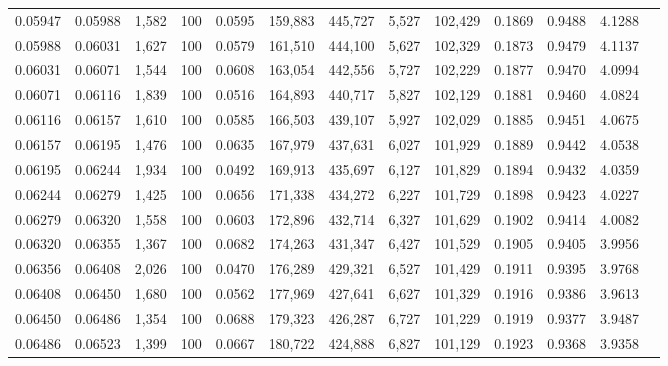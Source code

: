 \begin{tabular}{rrrrrrrrrrrrr}
0.05947 & 0.05988 & 1,582 & 100 &                                     0.0595 & 159,883 & 445,727 &   5,527 & 102,429 & 0.1869 & 0.9488 & 4.1288 \\
0.05988 & 0.06031 & 1,627 & 100 &                                     0.0579 & 161,510 & 444,100 &   5,627 & 102,329 & 0.1873 & 0.9479 & 4.1137 \\
0.06031 & 0.06071 & 1,544 & 100 &                                     0.0608 & 163,054 & 442,556 &   5,727 & 102,229 & 0.1877 & 0.9470 & 4.0994 \\
0.06071 & 0.06116 & 1,839 & 100 &                                     0.0516 & 164,893 & 440,717 &   5,827 & 102,129 & 0.1881 & 0.9460 & 4.0824 \\
0.06116 & 0.06157 & 1,610 & 100 &                                     0.0585 & 166,503 & 439,107 &   5,927 & 102,029 & 0.1885 & 0.9451 & 4.0675 \\
0.06157 & 0.06195 & 1,476 & 100 &                                     0.0635 & 167,979 & 437,631 &   6,027 & 101,929 & 0.1889 & 0.9442 & 4.0538 \\
0.06195 & 0.06244 & 1,934 & 100 &                                     0.0492 & 169,913 & 435,697 &   6,127 & 101,829 & 0.1894 & 0.9432 & 4.0359 \\
0.06244 & 0.06279 & 1,425 & 100 &                                     0.0656 & 171,338 & 434,272 &   6,227 & 101,729 & 0.1898 & 0.9423 & 4.0227 \\
0.06279 & 0.06320 & 1,558 & 100 &                                     0.0603 & 172,896 & 432,714 &   6,327 & 101,629 & 0.1902 & 0.9414 & 4.0082 \\
0.06320 & 0.06355 & 1,367 & 100 &                                     0.0682 & 174,263 & 431,347 &   6,427 & 101,529 & 0.1905 & 0.9405 & 3.9956 \\
0.06356 & 0.06408 & 2,026 & 100 &                                     0.0470 & 176,289 & 429,321 &   6,527 & 101,429 & 0.1911 & 0.9395 & 3.9768 \\
0.06408 & 0.06450 & 1,680 & 100 &                                     0.0562 & 177,969 & 427,641 &   6,627 & 101,329 & 0.1916 & 0.9386 & 3.9613 \\
0.06450 & 0.06486 & 1,354 & 100 &                                     0.0688 & 179,323 & 426,287 &   6,727 & 101,229 & 0.1919 & 0.9377 & 3.9487 \\
0.06486 & 0.06523 & 1,399 & 100 &                                     0.0667 & 180,722 & 424,888 &   6,827 & 101,129 & 0.1923 & 0.9368 & 3.9358 \\

\end{tabular}
